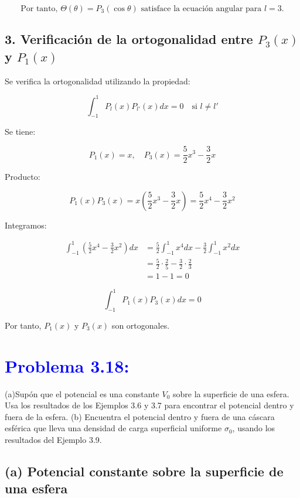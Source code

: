 \documentclass[12pt]{article}
\newcommand{\question}[1]{\textcolor{blue}{\textbf{#1}}}
\begin{document}
\[
\boxed{\text{Por tanto, } \Theta(\theta) = P_3(\cos\theta) \text{ satisface la ecuación angular para } l = 3.}
\]

\subsection*{3. Verificación de la ortogonalidad entre \( P_3(x) \) y \( P_1(x) \)}

Se verifica la ortogonalidad utilizando la propiedad:

\[
\int_{-1}^1 P_l(x) P_{l'}(x) dx = 0 \quad \text{si } l \ne l'
\]

Se tiene:

\[
P_1(x) = x, \quad P_3(x) = \frac{5}{2}x^3 - \frac{3}{2}x
\]

Producto:

\[
P_1(x) P_3(x) = x\left( \frac{5}{2}x^3 - \frac{3}{2}x \right) = \frac{5}{2}x^4 - \frac{3}{2}x^2
\]

Integramos:

\begin{align*}
\int_{-1}^1 \left( \frac{5}{2}x^4 - \frac{3}{2}x^2 \right) dx &= \frac{5}{2} \int_{-1}^1 x^4 dx - \frac{3}{2} \int_{-1}^1 x^2 dx \\
&= \frac{5}{2} \cdot \frac{2}{5} - \frac{3}{2} \cdot \frac{2}{3} \\
&= 1 - 1 = 0
\end{align*}

\[
\boxed{\int_{-1}^1 P_1(x)P_3(x)dx = 0}
\]

Por tanto, \( P_1(x) \) y \( P_3(x) \) son ortogonales.
\vspace{5mm}
\\

\section*{\question{Problema 3.18:}}  (a)Supón que el potencial es una constante \( V_0 \) sobre la superficie de una esfera. Usa los resultados de los Ejemplos 3.6 y 3.7 para encontrar el potencial dentro y fuera de la esfera.
(b) Encuentra el potencial dentro y fuera de una cáscara esférica que lleva una densidad de carga superficial uniforme \( \sigma_0 \), usando los resultados del Ejemplo 3.9.

\subsection*{(a) Potencial constante sobre la superficie de una esfera}
\end{document}
